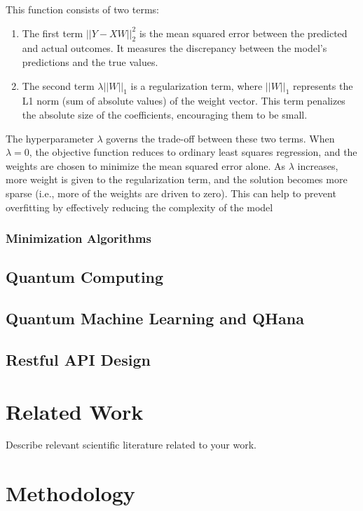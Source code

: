 \documentclass[
  a4paper,  %
  twoside,  %
  bibliography=totoc,
  headsepline,
  cleardoublepage=empty,
  parskip=half,
  draft=false
]{scrbook}
\begin{document}
This function consists of two terms:
\begin{enumerate}
  \item The first term \(||Y - XW||^2_2\) is the mean squared error between the predicted and actual outcomes.
  It measures the discrepancy between the model's predictions and the true values.
  \item The second term \(\lambda ||W||_1\) is a regularization term, where \(||W||_1\) represents the L1 norm (sum of absolute values) of the weight vector.
  This term penalizes the absolute size of the coefficients, encouraging them to be small.
\end{enumerate}
The hyperparameter \(\lambda\) governs the trade-off between these two terms.
When \(\lambda = 0\), the objective function reduces to ordinary least squares regression, and the weights are chosen to minimize the mean squared error alone.
As \(\lambda\) increases, more weight is given to the regularization term, and the solution becomes more sparse (i.e., more of the weights are driven to zero).
This can help to prevent overfitting by effectively reducing the complexity of the model \cite{ShalevShwartz2014}

\subsection*{Minimization Algorithms}
\label{subsec:minimizationAlgorithms}

\section{Quantum Computing}
\label{sec:quantumComputing}
\section{Quantum Machine Learning and QHana}
\label{sec:quantumMachineLearning}
\section{Restful API Design}


\chapter{Related Work}

Describe relevant scientific literature related to your work.

\chapter*{Methodology}
\label{chap:methodology}
\end{document}
